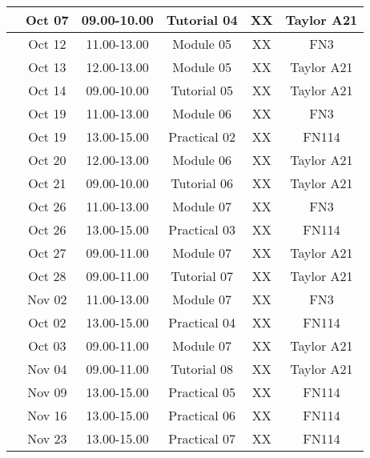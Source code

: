 \documentclass[12pts,a4paper,amsmath,amssymb,floatfix]{article}%
\begin{document}
\begin{center}
\begin{tabular}{||c||c|c|c|c|c||}
                                      & Oct 07    & 09.00-10.00 & Tutorial 04 & XX  & Taylor A21 \\
\hline
\multirow{3}{*}{\color{red}{Week 11}} & Oct 12    & 11.00-13.00 & Module 05   & XX  & FN3 \\
                                      & Oct 13    & 12.00-13.00 & Module 05   & XX  & Taylor A21 \\
                                      & Oct 14    & 09.00-10.00 & Tutorial 05 & XX  & Taylor A21 \\
\hline
\multirow{3}{*}{\color{red}{Week 12}} & Oct 19    & 11.00-13.00 & Module 06   & XX  & FN3 \\
                                      & Oct 19    & 13.00-15.00 & Practical 02 & XX & FN114 \\
                                      & Oct 20    & 12.00-13.00 & Module 06   & XX  & Taylor A21 \\
                                      & Oct 21    & 09.00-10.00 & Tutorial 06 & XX  & Taylor A21 \\
\hline
\multirow{3}{*}{\color{red}{Week 13}} & Oct 26    & 11.00-13.00 & Module 07   & XX  & FN3 \\
                                      & Oct 26    & 13.00-15.00 & Practical 03 & XX & FN114 \\
                                      & Oct 27    & 09.00-11.00 & Module 07   & XX  & Taylor A21 \\
                                      & Oct 28    & 09.00-11.00 & Tutorial 07 & XX  & Taylor A21 \\
\hline
\multirow{3}{*}{\color{red}{Week 14}} & Nov 02    & 11.00-13.00 & Module 07   & XX  & FN3 \\
                                      & Oct 02    & 13.00-15.00 & Practical 04 & XX & FN114 \\
                                      & Oct 03    & 09.00-11.00 & Module 07   & XX  & Taylor A21 \\
                                      & Nov 04    & 09.00-11.00 & Tutorial 08 & XX  & Taylor A21 \\
\hline
\multirow{1}{*}{\color{red}{Week 15}} & Nov 09    & 13.00-15.00 & Practical 05 & XX  & FN114 \\
\hline
\multirow{1}{*}{\color{red}{Week 16}} & Nov 16    & 13.00-15.00 & Practical 06 & XX  & FN114 \\
\hline
\multirow{1}{*}{\color{red}{Week 17}} & Nov 23    & 13.00-15.00 & Practical 07 & XX  & FN114  \\
\hline\hline

\end{tabular}
\end{center}
\end{document}
